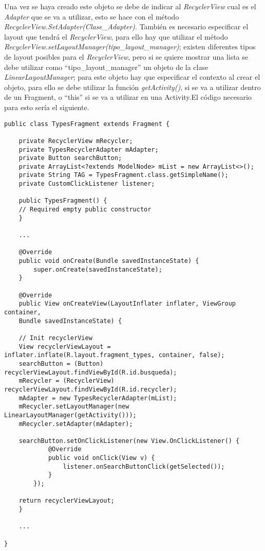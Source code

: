 Una vez se haya creado este objeto se debe de indicar al \textit{RecyclerView} cual es el \textit{Adapter} que se va a utilizar, esto se hace con el método \textit{RecyclerView.SetAdapter(Clase\_Adapter)}. También es necesario especificar el layout que tendrá el \textit{RecyclerView}, para ello hay que utilizar el método \textit{RecyclerView.setLayoutManager(tipo\_layout\_manager)}; existen diferentes tipos de layout posibles para el \textit{RecyclerView}, pero si se quiere mostrar una lista se debe utilizar como \enquote{tipo\_layout\_manager} un objeto de la clase \textit{LinearLayoutManager}; para este objeto hay que especificar el contexto al crear el objeto, para ello se debe utilizar la función \textit{getActivity()}, si se va a utilizar dentro de un Fragment, o \enquote{this} si se va a utilizar en una Activity.El código necesario para esto sería el siguiente.

\begin{lstlisting}[caption=Código de una clase que contiene un RecyclerView]
public class TypesFragment extends Fragment {

	private RecyclerView mRecycler;
	private TypesRecyclerAdapter mAdapter;
	private Button searchButton;
	private ArrayList<?extends ModelNode> mList = new ArrayList<>();
	private String TAG = TypesFragment.class.getSimpleName();
	private CustomClickListener listener;
	
	public TypesFragment() {
	// Required empty public constructor
	}
	
	...
	
	@Override
	public void onCreate(Bundle savedInstanceState) {
		super.onCreate(savedInstanceState);
	}
	
	@Override
	public View onCreateView(LayoutInflater inflater, ViewGroup container,
	Bundle savedInstanceState) {
	
	// Init recyclerView
	View recyclerViewLayout = inflater.inflate(R.layout.fragment_types, container, false);
	searchButton = (Button) recyclerViewLayout.findViewById(R.id.busqueda);
	mRecycler = (RecyclerView) recyclerViewLayout.findViewById(R.id.recycler);
	mAdapter = new TypesRecyclerAdapter(mList);
	mRecycler.setLayoutManager(new LinearLayoutManager(getActivity()));
	mRecycler.setAdapter(mAdapter);
	
	searchButton.setOnClickListener(new View.OnClickListener() {
			@Override
			public void onClick(View v) {
				listener.onSearchButtonClick(getSelected());
			}
		});
	
	return recyclerViewLayout;
	}
		
	...

}
\end{lstlisting}
 
